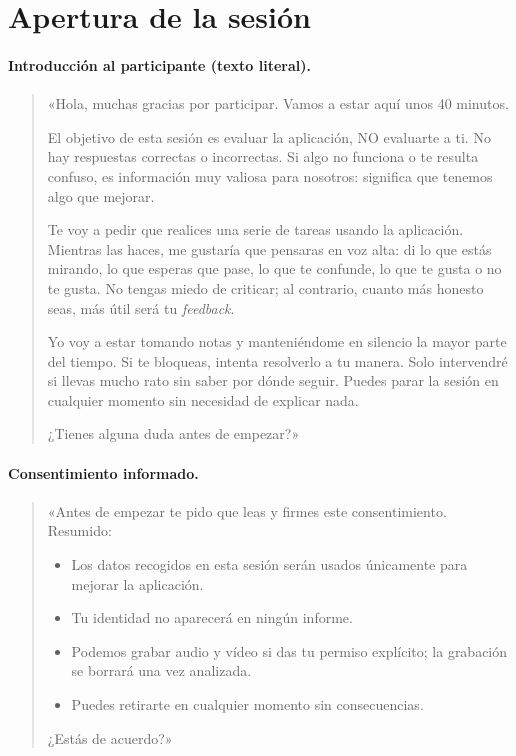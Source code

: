 \section{Apertura de la sesión}

\paragraph{Introducción al participante (texto literal).}
\begin{quote}
«Hola, muchas gracias por participar. Vamos a estar aquí unos 40 minutos.

El objetivo de esta sesión es evaluar la aplicación, NO evaluarte a ti. No hay respuestas
correctas o incorrectas. Si algo no funciona o te resulta confuso, es información muy valiosa
para nosotros: significa que tenemos algo que mejorar.

Te voy a pedir que realices una serie de tareas usando la aplicación. Mientras las haces,
me gustaría que pensaras en voz alta: di lo que estás mirando, lo que esperas que pase, lo
que te confunde, lo que te gusta o no te gusta. No tengas miedo de criticar; al contrario,
cuanto más honesto seas, más útil será tu \textit{feedback}.

Yo voy a estar tomando notas y manteniéndome en silencio la mayor parte del tiempo. Si te
bloqueas, intenta resolverlo a tu manera. Solo intervendré si llevas mucho rato sin saber
por dónde seguir. Puedes parar la sesión en cualquier momento sin necesidad de explicar nada.

¿Tienes alguna duda antes de empezar?»
\end{quote}

\paragraph{Consentimiento informado.}
\begin{quote}
«Antes de empezar te pido que leas y firmes este consentimiento. Resumido:
\begin{itemize}
\item Los datos recogidos en esta sesión serán usados únicamente para mejorar la aplicación.
\item Tu identidad no aparecerá en ningún informe.
\item Podemos grabar audio y vídeo si das tu permiso explícito; la grabación se borrará una
  vez analizada.
\item Puedes retirarte en cualquier momento sin consecuencias.
\end{itemize}
¿Estás de acuerdo?»
\end{quote}

